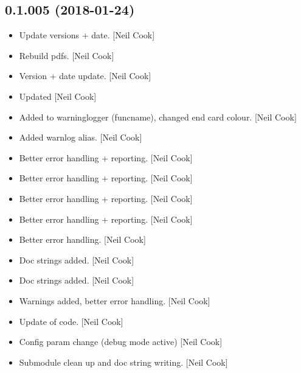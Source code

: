 \documentclass[a4paper,10pt,english]{report}
\begin{document}
\subsection{0.1.005 (2018-01-24)}
\label{\detokenize{misc/changelog:id499}}\begin{itemize}
\item {} 
Update versions + date. {[}Neil Cook{]}

\item {} 
Rebuild pdfs. {[}Neil Cook{]}

\item {} 
Version + date update. {[}Neil Cook{]}

\item {} 
Updated  {[}Neil Cook{]}

\item {} 
Added to warninglogger (funcname), changed end card colour. {[}Neil
Cook{]}

\item {} 
Added warnlog alias. {[}Neil Cook{]}

\item {} 
Better error handling + reporting. {[}Neil Cook{]}

\item {} 
Better error handling + reporting. {[}Neil Cook{]}

\item {} 
Better error handling + reporting. {[}Neil Cook{]}

\item {} 
Better error handling + reporting. {[}Neil Cook{]}

\item {} 
Better error handling. {[}Neil Cook{]}

\item {} 
Doc strings added. {[}Neil Cook{]}

\item {} 
Doc strings added. {[}Neil Cook{]}

\item {} 
Warnings added, better error handling. {[}Neil Cook{]}

\item {} 
Update of code. {[}Neil Cook{]}

\item {} 
Config param change (debug mode active) {[}Neil Cook{]}

\item {} 
Submodule clean up and doc string writing. {[}Neil Cook{]}


\end{itemize}
\end{document}
